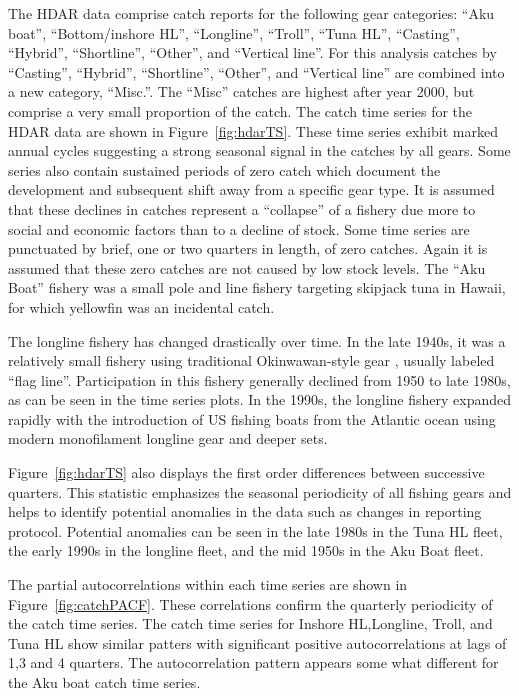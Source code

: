 \documentclass[12pt,letterpaper]{article}
\newcommand\help[1]{\color{Magenta}{\it #1 }\normalcolor}
\begin{document}
The HDAR data comprise catch reports for the following gear
categories:
``Aku boat'', ``Bottom/inshore HL'', ``Longline'',  ``Troll'', ``Tuna
HL'', ``Casting'', ``Hybrid'',  ``Shortline'', ``Other'', and
``Vertical line''.
For this analysis catches by ``Casting'', ``Hybrid'',
``Shortline'', ``Other'', and ``Vertical line'' are combined into a new
category, ``Misc.''. The ``Misc''
catches are highest after year 2000,
but comprise a very small proportion of the catch.
The catch time series for the HDAR data are shown in
Figure~\ref{fig:hdarTS}. These time
series exhibit marked annual cycles suggesting a strong seasonal
signal in the catches by all gears.
Some series also contain sustained periods of zero catch which
document the development and subsequent shift away from a specific
gear type. It is assumed that these declines in catches represent a
``collapse'' of a fishery due more to social and economic factors than
to a decline of stock.
Some time series are punctuated by brief, one or two quarters in
length, of zero catches. Again it is assumed that these zero catches
are not caused by low stock levels.
The ``Aku Boat'' fishery was a small pole and line fishery
targeting skipjack tuna in Hawaii, for which yellowfin was an
incidental catch. 

The longline fishery has changed drastically over time. In the late
1940s, it was a relatively small fishery using traditional
Okinwawan-style gear \help{(reference)}, usually labeled ``flag
line''. Participation in this fishery generally declined from 1950 to
late 1980s, as can be seen in the time series plots. In the 1990s, the longline
fishery expanded rapidly with the introduction of US fishing boats
from the Atlantic ocean using modern monofilament longline gear and
deeper sets.

Figure~\ref{fig:hdarTS} also displays the first order differences
between successive quarters. This statistic emphasizes the seasonal
periodicity of all fishing gears and helps to identify potential anomalies in
the data such as changes in reporting protocol. Potential
anomalies can be seen in the late 1980s in the Tuna HL fleet, the
early 1990s in the longline fleet, and the mid 1950s in the Aku Boat
fleet. 

The partial autocorrelations within each time
series are shown in Figure~\ref{fig:catchPACF}. These correlations
confirm the quarterly periodicity  of the catch time series.
The catch time series for Inshore HL,Longline, Troll, and Tuna HL show
similar patters with
significant positive autocorrelations at lags of 1,3 and 4 quarters.
The autocorrelation pattern appears some what different for the Aku
boat catch time series.
\end{document}
